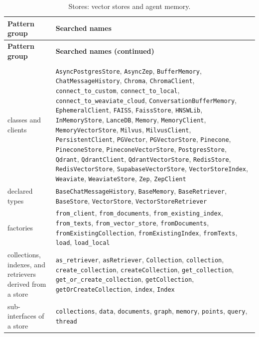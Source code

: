 {\begin{longtable}{@{}>{\raggedright\arraybackslash}p{}>{\raggedright\arraybackslash}p{}@{}}
\caption{Stores: vector stores and agent memory.}\label{tab:app-stores}\\
\toprule
\textbf{Pattern group} & \textbf{Searched names} \\
\midrule
\endfirsthead
\toprule
\textbf{Pattern group} & \textbf{Searched names (continued)} \\
\midrule
\endhead
\bottomrule
\endfoot
\addlinespace[3pt]\multicolumn{2}{@{}l}{\emph{store objects}} \\
classes and clients & \texttt{AsyncPostgresStore}, \texttt{AsyncZep}, \texttt{BufferMemory}, \texttt{ChatMessageHistory}, \texttt{Chroma}, \texttt{ChromaClient}, \texttt{connect\_to\_custom}, \texttt{connect\_to\_local}, \texttt{connect\_to\_weaviate\_cloud}, \texttt{ConversationBufferMemory}, \texttt{EphemeralClient}, \texttt{FAISS}, \texttt{FaissStore}, \texttt{HNSWLib}, \texttt{InMemoryStore}, \texttt{LanceDB}, \texttt{Memory}, \texttt{MemoryClient}, \texttt{MemoryVectorStore}, \texttt{Milvus}, \texttt{MilvusClient}, \texttt{PersistentClient}, \texttt{PGVector}, \texttt{PGVectorStore}, \texttt{Pinecone}, \texttt{PineconeStore}, \texttt{PineconeVectorStore}, \texttt{PostgresStore}, \texttt{Qdrant}, \texttt{QdrantClient}, \texttt{QdrantVectorStore}, \texttt{RedisStore}, \texttt{RedisVectorStore}, \texttt{SupabaseVectorStore}, \texttt{VectorStoreIndex}, \texttt{Weaviate}, \texttt{WeaviateStore}, \texttt{Zep}, \texttt{ZepClient} \\
declared types & \texttt{BaseChatMessageHistory}, \texttt{BaseMemory}, \texttt{BaseRetriever}, \texttt{BaseStore}, \texttt{VectorStore}, \texttt{VectorStoreRetriever} \\
factories & \texttt{from\_client}, \texttt{from\_documents}, \texttt{from\_existing\_index}, \texttt{from\_texts}, \texttt{from\_vector\_store}, \texttt{fromDocuments}, \texttt{fromExistingCollection}, \texttt{fromExistingIndex}, \texttt{fromTexts}, \texttt{load}, \texttt{load\_local} \\
collections, indexes, and retrievers derived from a store & \texttt{as\_retriever}, \texttt{asRetriever}, \texttt{Collection}, \texttt{collection}, \texttt{create\_collection}, \texttt{createCollection}, \texttt{get\_collection}, \texttt{get\_or\_create\_collection}, \texttt{getCollection}, \texttt{getOrCreateCollection}, \texttt{index}, \texttt{Index} \\
sub-interfaces of a store & \texttt{collections}, \texttt{data}, \texttt{documents}, \texttt{graph}, \texttt{memory}, \texttt{points}, \texttt{query}, \texttt{thread} \\

\end{longtable}}
